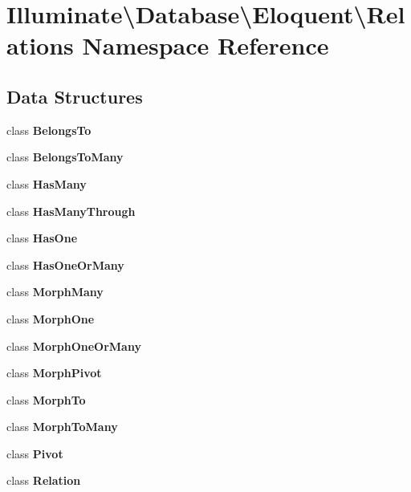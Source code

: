\section{Illuminate\textbackslash{}Database\textbackslash{}Eloquent\textbackslash{}Relations Namespace Reference}
\label{namespace_illuminate_1_1_database_1_1_eloquent_1_1_relations}
\subsection*{Data Structures}
\begin{DoxyCompactItemize}
\item 
class {\bf Belongs\+To}
\item 
class {\bf Belongs\+To\+Many}
\item 
class {\bf Has\+Many}
\item 
class {\bf Has\+Many\+Through}
\item 
class {\bf Has\+One}
\item 
class {\bf Has\+One\+Or\+Many}
\item 
class {\bf Morph\+Many}
\item 
class {\bf Morph\+One}
\item 
class {\bf Morph\+One\+Or\+Many}
\item 
class {\bf Morph\+Pivot}
\item 
class {\bf Morph\+To}
\item 
class {\bf Morph\+To\+Many}
\item 
class {\bf Pivot}
\item 
class {\bf Relation}
\end{DoxyCompactItemize}
